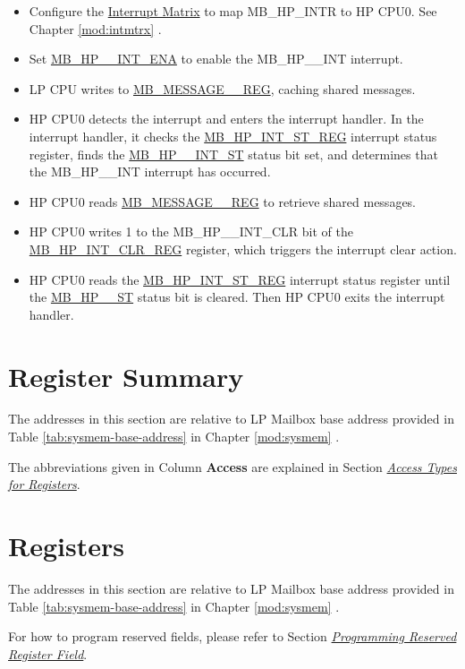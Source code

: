 \documentclass[main\_\_EN.tex]{subfiles}
\begin{document}
\begin{itemize}
    \begin{itemize}
        \item Configure the \hyperref[mod:intmtrx]{Interrupt Matrix} to map MB\_HP\_INTR to HP CPU0. See Chapter \ref{mod:intmtrx} \textit{}.
        \item Set \hyperref[fielddesc:MBHP0INTENA]{MB\_HP\_\_INT\_ENA} to enable the MB\_HP\_\_INT interrupt.
        \item LP CPU writes to \hyperref[regdesc:MBMESSAGE0REG]{MB\_MESSAGE\_\_REG}, caching shared messages.
        \item HP CPU0 detects the interrupt and enters the interrupt handler. In the interrupt handler, it checks the \hyperref[regdesc:MBHPINTSTREG]{MB\_HP\_INT\_ST\_REG} interrupt status register, finds the \hyperref[fielddesc:MBHP0INTST]{MB\_HP\_\_INT\_ST} status bit set, and determines that the MB\_HP\_\_INT interrupt has occurred.
        \item HP CPU0 reads \hyperref[regdesc:MBMESSAGE0REG]{MB\_MESSAGE\_\_REG} to retrieve shared messages.
        \item HP CPU0 writes 1 to the {MB\_HP\_\_INT\_CLR} bit of the \hyperref[regdesc:MBHPINTCLRREG]{MB\_HP\_INT\_CLR\_REG} register, which triggers the interrupt clear action.
        \item HP CPU0 reads the \hyperref[regdesc:MBHPINTSTREG]{MB\_HP\_INT\_ST\_REG} interrupt status register until the \hyperref[fielddesc:MBHP0INTST]{MB\_HP\_\_ST} status bit is cleared. Then HP CPU0 exits the interrupt handler.
    \end{itemize}
\end{itemize}


\hypertarget{lpmailbox-reg-summ}{}
\section{Register Summary}
\label{sec:lpmailbox-reg-summ}

The addresses in this section are relative to LP Mailbox base address provided in Table \ref{tab:sysmem-base-address} in Chapter \ref{mod:sysmem} \textit{}.

The abbreviations given in Column \textbf{Access} are explained in Section \hyperref[glossary-access-types]{\textit{Access Types for Registers}}.




\section{Registers}

The addresses in this section are relative to LP Mailbox base address provided in Table \ref{tab:sysmem-base-address} in Chapter \ref{mod:sysmem} \textit{}.

For how to program reserved fields, please refer to Section \hyperref[programming-reserved-field]{\textit{Programming Reserved Register Field}}.


\end{document}
